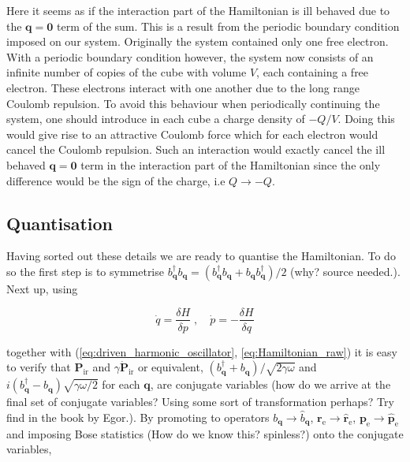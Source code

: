 \documentclass[12pt]{report}
\renewcommand{\vec}[1]{\boldsymbol{\mathbf{#1}}}                        %
\newcommand{\question}[1]{{\leavevmode\color{question}#1}}
\begin{document}
Here it seems as if the interaction part of the Hamiltonian is ill behaved due to the $ \vec q = \vec 0 $ term of the sum. This is a result from the periodic boundary condition imposed on our system. Originally the system contained only one free electron. With a periodic boundary condition however, the system now consists of an infinite number of copies of the cube with volume $ V $, each containing a free electron. These electrons interact with one another due to the long range Coulomb repulsion. To avoid this behaviour when periodically continuing the system, one should introduce in each cube a charge density of $ - Q/V $. Doing this would give rise to an attractive Coulomb force which for each electron would cancel the Coulomb repulsion. Such an interaction would exactly cancel the ill behaved $ \vec q = \vec 0 $ term in the interaction part of the Hamiltonian since the only difference would be the sign of the charge, i.e $ Q \rightarrow -Q $.

\subsection{Quantisation}

Having sorted out these details we are ready to quantise the Hamiltonian. To do so the first step is to symmetrise $ b^\dagger_{\vec q} b_{\vec q} = (b^\dagger_{\vec q} b_{\vec q} + b_{\vec q} b^\dagger_{\vec q})/2 $ \question{(why? source needed.)}. Next up, using\cite{superfluidStatesOfMatter}

\begin{equation}
	\dot q = \frac{\delta H}{\delta p}
	\; , \quad
	\dot p = - \frac{\delta H}{\delta q}
\end{equation}

together with (\ref{eq:driven_harmonic_oscillator}, \ref{eq:Hamiltonian_raw}) it is easy to verify that $ \vec P_\text{ir} $ and $ \gamma \dot{ \vec P}_\text{ir} $ or equivalent, $ (b^\dagger_{\vec q} + b_{\vec q})/\sqrt{2 \gamma \omega} $ and $ i (b^\dagger_{\vec q} - b_{\vec q}) \sqrt{\gamma \omega / 2} $ for each $ \vec q $, are conjugate variables \question{(how do we arrive at the final set of conjugate variables? Using some sort of transformation perhaps? Try find in the book by Egor.)}.  By promoting to operators $ b_{\vec q} \rightarrow \hat b_{\vec q} $, $ \vec r_\text{e} \rightarrow \hat{\vec r}_\text{e} $, $ \vec p_\text{e} \rightarrow \hat{\vec p}_\text{e} $ and imposing Bose statistics \question{(How do we know this? spinless?)} onto the conjugate variables,
\end{document}
